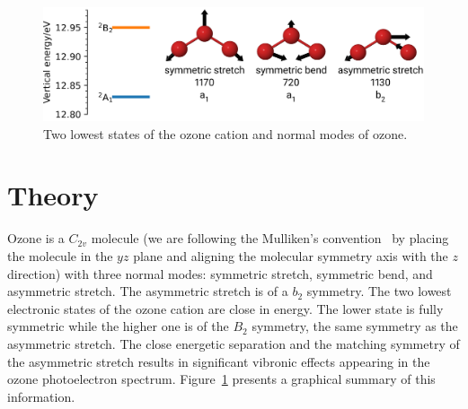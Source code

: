 \documentclass[12pt,a4paper,prb,aps,superscriptaddress]{revtex4}
\begin{document}
\begin{figure}
    \includegraphics[width = 16 cm]{./figures/ozone_intro}
    \caption{ 
        Two lowest states of the ozone cation and normal modes of ozone.
    }
    \label{fig:ozone_intro}
\end{figure}

\section{Theory}

Ozone is a $C_{2v}$ molecule (we are following the Mulliken's
convention~\cite{Mulliken:55:symnot} by placing the molecule in the $yz$ plane
and aligning the molecular symmetry axis with the $z$ direction) with three
normal modes: symmetric stretch, symmetric bend, and asymmetric stretch.  The
asymmetric stretch is of a $b_2$ symmetry. The two lowest electronic states of
the ozone cation are close in energy. The lower state is fully symmetric while
the higher one is of the $B_2$ symmetry, the same symmetry as the asymmetric
stretch. The close energetic separation and the matching symmetry of the
asymmetric stretch results in significant vibronic effects appearing in the
ozone photoelectron spectrum.  Figure~\ref{fig:ozone_intro} presents a
graphical summary of this information.
\end{document}
